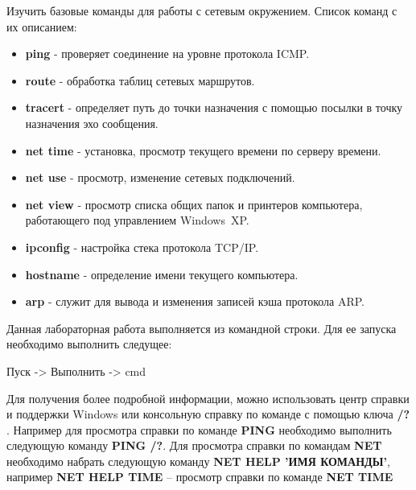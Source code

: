 \documentclass[a4paper,12pt]{article}
\begin{document}
  
  \begin{flushleft}
    Изучить базовые команды для работы с сетевым окружением.
    Список команд с их описанием:
    \begin{itemize}
     \item {\bf ping} - проверяет соединение на уровне протокола ICMP.
     \item {\bf route} - обработка таблиц сетевых маршрутов.
     \item {\bf tracert} - определяет путь до точки назначения с помощью посылки в точку назначения эхо сообщения.
     \item {\bf net time} - установка, просмотр текущего времени по серверу времени.
     \item {\bf net use} - просмотр, изменение сетевых подключений.
     \item {\bf net view} - просмотр списка общих папок и принтеров компьютера, работающего под управлением Windows XP.
     \item {\bf ipconfig} - настройка стека протокола TCP/IP.
     \item {\bf hostname} - определение имени текущего компьютера.
     \item {\bf arp} - служит для вывода и изменения записей кэша протокола ARP.
    \end{itemize}
  \end{flushleft}
  

  \begin{flushleft}
    Данная лабораторная работа выполняется из командной строки. Для ее запуска необходимо выполнить следущее:
    \begin{flushleft}
      Пуск -> Выполнить -> cmd \\[0.4cm]
    \end{flushleft}
  \end{flushleft}

  \begin{flushleft}
   Для получения более подробной информации, можно использовать центр справки и поддержки Windows или консольную справку по команде с помощью ключа {\bf /?} . Например для просмотра справки по команде {\bf PING} необходимо выполнить следующую команду {\bf PING /?}. Для просмотра справки по командам {\bf NET} необходимо набрать следующую команду {\bf NET HELP 'ИМЯ КОМАНДЫ'}, например {\bf NET HELP TIME} – просмотр справки по команде {\bf NET TIME} \\[0.2cm]
  \end{flushleft}
\end{document}

